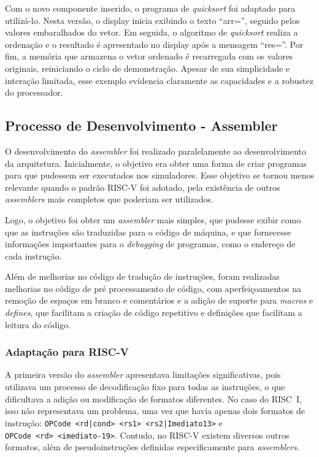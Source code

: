 \documentclass[
	12pt,				%
	openright,			%
	oneside,			%
	a4paper,			%
	english,			%
	french,				%
	spanish,			%
	brazil,				%
	]{abntex2}
\begin{document}
Com o novo componente inserido, o programa de \textit{quicksort} foi adaptado para utilizá-lo. Nesta versão, o display inicia exibindo o texto ``arr='', seguido pelos valores embaralhados do vetor. Em seguida, o algoritmo de \textit{quicksort} realiza a ordenação e o resultado é apresentado no display após a mensagem ``res=''. Por fim, a memória que armazena o vetor ordenado é recarregada com os valores originais, reiniciando o ciclo de demonstração. Apesar de sua simplicidade e interação limitada, esse exemplo evidencia claramente as capacidades e a robustez do processador.


\subsection{Processo de Desenvolvimento - Assembler}\label{process_assembler}

O desenvolvimento do \textit{assembler} foi realizado paralelamente ao desenvolvimento da arquitetura. Inicialmente, o objetivo era obter uma forma de criar programas para que pudessem ser executados nos simuladores. Esse objetivo se tornou menos relevante quando o padrão RISC-V foi adotado, pela existência de outros \textit{assemblers} mais completos que poderiam ser utilizados.

Logo, o objetivo foi obter um \textit{assembler} mais simples, que pudesse exibir como que as instruções são traduzidas para o código de máquina, e que fornecesse informações importantes para o \textit{debugging} de programas, como o endereço de cada instrução.

Além de melhorias no código de tradução de instruções, foram realizadas melhorias no código de pré processamento de código, com aperfeiçoamentos na remoção de espaços em branco e comentários e a adição de suporte para \textit{macros} e \textit{defines}, que facilitam a criação de código repetitivo e definições que facilitam a leitura do código.

\subsubsection{Adaptação para RISC-V}

A primeira versão do \textit{assembler} apresentava limitações significativas, pois utilizava um processo de decodificação fixo para todas as instruções, o que dificultava a adição ou modificação de formatos diferentes. No caso do RISC~I, isso não representava um problema, uma vez que havia apenas dois formatos de instrução: \texttt{OPCode~<rd|cond> <rs1>~<rs2|Imediato13>} e \texttt{OPCode~<rd>~<imediato-19>}. Contudo, no RISC-V existem diversos outros formatos, além de pseudoinstruções definidas especificamente para \textit{assemblers}\cite{risc-v_risc-v_2025}.
\end{document}
